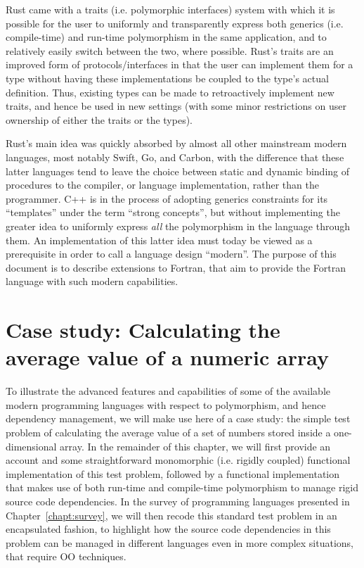 \documentclass[11pt,oneside]{report}
\begin{document}
Rust came with a traits (i.e. polymorphic interfaces) system with which
it is possible for the user to uniformly and transparently express
both generics (i.e. compile-time) and run-time polymorphism in the
same application, and to relatively easily switch between the two,
where possible. Rust's traits are an improved form of
protocols/interfaces in that the user can implement them for a type
without having these implementations be coupled to the type's actual
definition. Thus, existing types can be made to retroactively
implement new traits, and hence be used in new settings (with some
minor restrictions on user ownership of either the traits or the
types).

Rust's main idea was quickly absorbed by almost all other mainstream
modern languages, most notably Swift, Go, and Carbon, with the
difference that these latter languages tend to leave the choice
between static and dynamic binding of procedures to the compiler, or
language implementation, rather than the programmer. C++ is in the
process of adopting generics constraints for its ``templates'' under
the term ``strong concepts'', but without implementing the greater
idea to uniformly express \emph{all} the polymorphism in the language
through them. An implementation of this latter idea must today be
viewed as a prerequisite in order to call a language design
``modern''. The purpose of this document is to describe extensions to
Fortran, that aim to provide the Fortran language with such modern
capabilities.

\chapter{Case study: Calculating the average value of a numeric array}

To illustrate the advanced features and capabilities of some of the
available modern programming languages with respect to polymorphism,
and hence dependency management, we will make use here of a case
study: the simple test problem of calculating the average value of a
set of numbers stored inside a one-dimensional array. In the remainder
of this chapter, we will first provide an account and some
straightforward monomorphic (i.e. rigidly coupled) functional
implementation of this test problem, followed by a functional
implementation that makes use of both run-time and compile-time
polymorphism to manage rigid source code dependencies. In the survey
of programming languages presented in Chapter~\ref{chapt:survey}, we
will then recode this standard test problem in an encapsulated
fashion, to highlight how the source code dependencies in this problem
can be managed in different languages even in more complex situations,
that require OO techniques.
\end{document}
